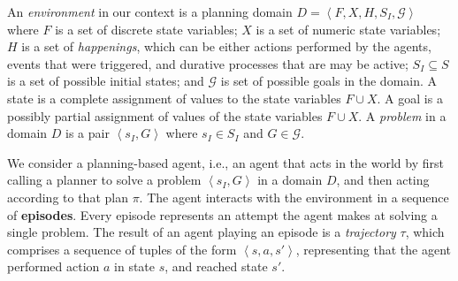 \documentclass[letterpaper]{article} %
\newcommand{\tuple}[1]{\ensuremath{\left \langle #1 \right \rangle }} %
\begin{document}
An \emph{environment} in our context is a planning domain $D=\tuple{F, X, H, S_I, \mathcal{G}}$ where
$F$ is a set of discrete state variables;
$X$ is a set of numeric state variables;
$H$ is a set of \emph{happenings}, which can be either actions performed by the agents, events that were triggered, and durative processes that are may be active;
$S_I\subseteq S$ is a set of possible initial states;
and  $\mathcal{G}$ is set of possible goals in the domain.
A state is a complete assignment of values to the state variables $F\cup X$.
A goal is a possibly partial assignment of values of the state variables $F\cup X$.
A \emph{problem} in a domain $D$ is a pair $\tuple{s_I, G}$ where $s_I\in S_I$ and $G\in \mathcal{G}$.


We consider a planning-based agent, i.e., an agent that acts in the world by first calling a planner to solve a problem $\tuple{s_I, G}$ in a domain $D$, and then acting according to that plan $\pi$.
The agent interacts with the environment in a sequence of \textbf{episodes}.
Every episode represents an attempt the agent makes at solving a single problem.
The result of an agent playing an episode is a \emph{trajectory} $\tau$, which comprises a sequence of tuples of the form $\tuple{s, a, s'}$, representing that the agent performed action $a$ in state $s$, and reached state $s'$.

\end{document}
